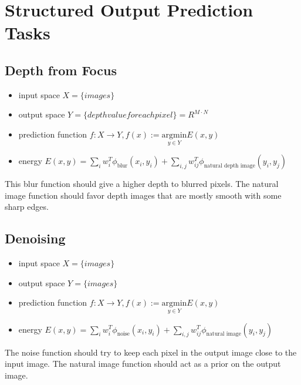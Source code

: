 
\section*{Structured Output Prediction Tasks}

\subsection*{Depth from Focus}
\begin{itemize}
    \item input space $X = \{images \}$
    \item output space $Y = \{depth value for each pixel\} = R^{M\cdot N}$
    \item prediction function $f : X \rightarrow Y, f(x):= \underset{y \in Y}{\text{argmin}} E(x,y)$
    \item energy $E(x,y) = \sum_i w^T_i \phi_{\text{blur}}(x_i, y_i) + \sum_{i,j} w^T_{ij} \phi_{\text{natural depth image}}(y_i, y_j)$
\end{itemize}

This blur function should give a higher depth to blurred pixels. The natural image function should favor depth images that are mostly smooth with some sharp edges.

\subsection*{Denoising} 

\begin{itemize}
    \item input space $X = \{images \}$
    \item output space $Y = \{images \}$
    \item prediction function $f : X \rightarrow Y, f(x):= \underset{y \in Y}{\text{argmin}} E(x,y)$
    \item energy $E(x,y) = \sum_i w^T_i \phi_{\text{noise}}(x_i, y_i) + \sum_{i,j} w^T_{ij} \phi_{\text{natural image}}(y_i, y_j)$
\end{itemize}

The noise function should try to keep each pixel in the output image close to the input image. The natural image function should act as a prior on the output image.